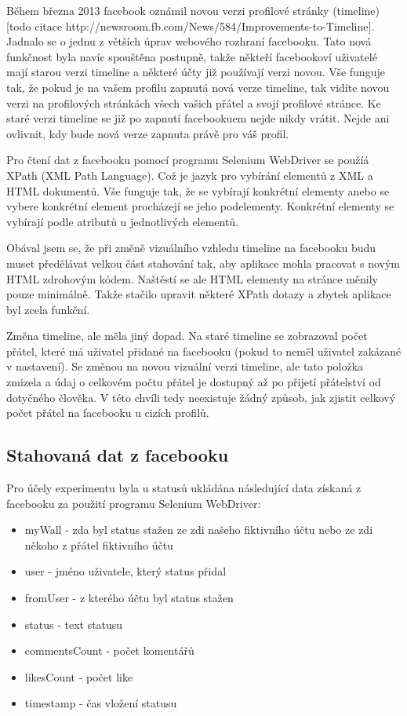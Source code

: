 \documentclass[thesis=M,czech]{FITthesis}[2013/05/10]
\begin{document}
Během března 2013 facebook oznámil novou verzi profilové stránky (timeline) [todo citace http://newsroom.fb.com/News/584/Improvements-to-Timeline]. Jadnalo se o jednu z větších úprav webového rozhraní facebooku. Tato nová funkčnost byla navíc spouštěna postupně, takže někteří facebookoví uživatelé mají starou verzi timeline a některé účty již používají verzi novou. Vše funguje tak, že pokud je na vašem profilu zapnutá nová verze timeline, tak vidíte novou verzi na profilových stránkách všech vašich přátel a svojí profilové stránce. Ke staré verzi timeline se již po zapnutí facebookuem nejde nikdy vrátit. Nejde ani ovlivnit, kdy bude nová verze zapnuta právě pro váš profil.

Pro čtení dat z facebooku pomocí programu Selenium WebDriver se použíá XPath (XML Path Language). Což je jazyk pro vybírání elementů z XML a HTML dokumentů. Vše funguje tak, že se vybírají konkrétní elementy anebo se vybere konkrétní element procházejí se jeho podelementy. Konkrétní elementy se vybírají podle atributů u jednotlivých elementů.

Obával jsem se, že při změně vizuálního vzhledu timeline na facebooku budu muset předělávat velkou část stahování tak, aby aplikace mohla pracovat s novým HTML zdrohovým kódem. Naštěstí se ale HTML elementy na stránce měnily pouze minimálně. Takže stačilo upravit některé XPath dotazy a zbytek aplikace byl zcela funkční.

Změna timeline, ale měla jiný dopad. Na staré timeline se zobrazoval počet přátel, které má uživatel přidané na facebooku (pokud to neměl uživatel zakázané v nastavení). Se změnou na novou vizuální verzi timeline, ale tato položka zmizela a údaj o celkovém počtu přátel je dostupný až po přijetí přátelství od dotyčného člověka. V této chvíli tedy neexistuje žádný způsob, jak zjistit celkový počet přátel na facebooku u cizích profilů. 

\subsection{Stahovaná dat z facebooku}

Pro účely experimentu byla u statusů ukládána následující data získaná z facebooku za použití programu Selenium WebDriver:

\begin{itemize}
  \item myWall - zda byl status stažen ze zdi našeho fiktivního účtu nebo ze zdi někoho z přátel fiktivního účtu
  \item user - jméno uživatele, který status přidal
  \item fromUser - z kterého účtu byl status stažen  
  \item status - text statusu
  \item commentsCount - počet komentářů
  \item likesCount - počet like
  \item timestamp - čas vložení statusu
\end{itemize}
\end{document}
